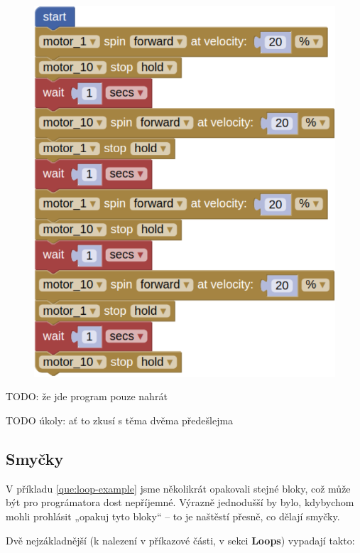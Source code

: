\documentclass[../main.tex]{subfiles}
\begin{document}
	\begin{solution}
		\begin{figure}[h!]
			\centering
			\begin{minipage}{0.5\textwidth}
				\includegraphics[width=\linewidth]{../Images/02/sol3.png}
			\end{minipage}
		\end{figure}
	\end{solution}

	TODO: že jde program pouze nahrát

	TODO úkoly: ať to zkusí s těma dvěma předešlejma

	\subsection{Smyčky}
	V příkladu \ref{que:loop-example} jsme několikrát opakovali stejné bloky, což může být pro prográmatora dost nepříjemné. Výrazně jednodušší by bylo, kdybychom mohli prohlásit „opakuj tyto bloky“ -- to je naštěstí přesně, co dělají smyčky.

	Dvě nejzákladnější (k nalezení v příkazové části, v sekci \textbf{Loops}) vypadají takto:
	\begin{itemize}
		\blockLoop
		\blockLoopForever
	\end{itemize}
\end{document}
